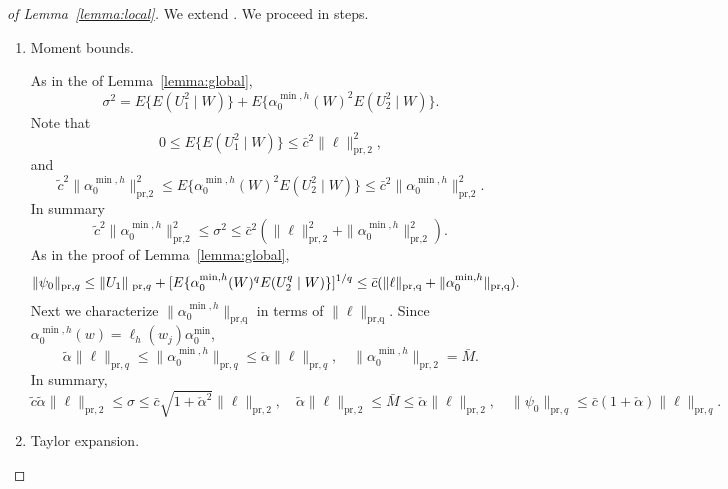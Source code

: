 \begin{proof}[of Lemma~\ref{lemma:local}]
We extend \cite[Lemma 3.4]{chernozhukov2018global}. We proceed in steps.
\begin{enumerate}
    \item Moment bounds. 
    
    As in the of Lemma~\ref{lemma:global},
$$
\sigma^2=E\{E(U_1^2 \mid W)\}+ E\{\alpha_0^{\min,h}(W)^2 E(U_2^2 \mid W)\}.
$$
Note that
$$
0 \leq E\{E(U_1^2 \mid W)\} \leq \bar{c}^2 \|\ell\|^2_{\text{pr},2},
$$
and
$$
\tilde{c}^2 \|\alpha_0^{\min,h}\|^2_{\text{pr,2}} \leq E\{\alpha_0^{\min,h}(W)^2 E(U_2^2 \mid W)\} \leq \bar{c}^2\|\alpha_0^{\min,h}\|^2_{\text{pr,2}}.
$$
In summary
$$
\tilde{c}^2 \|\alpha_0^{\min,h}\|^2_{\text{pr,2}}  \leq \sigma^2 \leq \bar{c}^2 (\|\ell\|^2_{\text{pr},2}+\|\alpha_0^{\min,h}\|^2_{\text{pr,2}}).
$$
As in the proof of Lemma~\ref{lemma:global},
\begin{align*}
  \|\psi_0\|_{\text{pr},q} &\leq   \|U_1\|_{\text{ \normalfont pr},q} + [E\{\alpha_0^{\min,h}(W)^q E( U_2^q \mid W)\}]^{1/q}  
  \leq  \bar{c} (\|\ell \|_{\text{pr,q}}+\|\alpha_0^{\min,h}\|_{\text{pr,q}}).
\end{align*}
Next we characterize $\|\alpha_0^{\min,h}\|_{\text{pr,q}}$ in terms of $\|\ell \|_{\text{pr,q}}$. Since $\alpha_0^{\min,h}(w)=\ell_h(w_j)\alpha_0^{\min}$,
$$
\tilde{\alpha} \|\ell\|_{\text{pr},q}\leq \|\alpha_0^{\min,h}\|_{\text{pr},q} \leq \check{\alpha} \|\ell\|_{\text{pr},q},\quad \|\alpha_0^{\min,h}\|_{\text{pr},2}=\bar{M}.
$$
In summary,
$$
\tilde{c}  \tilde{\alpha} \| \ell\|_{\text{pr},2}  \leq \sigma \leq \bar c \sqrt{1+ \check{\alpha}^2} \| \ell\|_{\text{pr},2}, \quad  \tilde{\alpha} \| \ell\|_{\text{pr},2}  \leq \bar{M} \leq \check{\alpha} \| \ell\|_{\text{pr},2},  \quad
\|\psi_0\|_{\text{pr},q}
\leq  \bar c (1 + \check{\alpha} ) \| \ell \|_{\text{pr},q}.
$$
    
    \item Taylor expansion.
    

\end{enumerate}
\end{proof}
